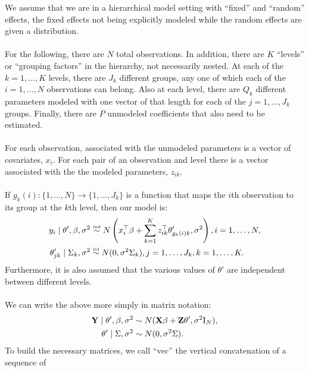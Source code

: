 \documentclass[10pt]{article}
\begin{document}
\normalem
\newcommand{\tr}[1]{\ensuremath{#1^{\text{\tiny T}}}}
\newcommand{\itr}[1]{\ensuremath{#1^{\text{\tiny -T}}}}
\setlength{\parindent}{0pt}

We assume that we are in a hierarchical model setting with ``fixed''
and ``random'' effects, the fixed effects not being explicitly modeled
while the random effects are given a distribution. \\ \\
For the following, there are $N$ total observations. In addition,
there are $K$ ``levels'' or ``grouping factors'' in the hierarchy, not necessarily
nested. At each of the $k=1,\ldots,K$ levels, there are $J_k$
different groups, any one of which each of the $i=1,\ldots,N$
observations can belong. Also at each level, there are $Q_k$
different parameters modeled with one vector of that length for
each of the $j=1,\ldots,J_k$ groups. Finally, there are $P$
unmodeled coefficients that also need to be estimated. \\ \\
For each observation, associated with the unmodeled parameters is a
vector of covariates, $x_i$. For each pair of an observation and
level there is a vector associated with the the modeled parameters, $z_{ik}$. \\ \\
If \(g_k(i) : \{1,\ldots,N\} \rightarrow \{1,\ldots,J_k\}\) is a
function that maps the $i$th observation to its group at the $k$th
level, then our model is:
\begin{align*}
y_i \mid \theta', \beta, \sigma^2 & \overset{\text{\tiny ind}}{\sim}
N\left(x_i^\top\beta + \sum_{k=1}^K z_{ik}^\top\theta_{g_k(i)k}', \sigma^2\right), i=1,\ldots,N, \\
\theta_{jk}' \mid \Sigma_k, \sigma^2 & \overset{\text{\tiny iid}}{\sim}
N(0, \sigma^2\Sigma_k), j=1,\ldots,J_k, k=1,\ldots,K.
\end{align*}
Furthermore, it is also assumed that the various values of $\theta'$
are independent between different levels. \\ \\
We can write the above more simply in matrix notation:
\begin{align*}
{\bf Y} \mid \theta', \beta, \sigma^2 & \sim
N({\bf X}\beta + {\bf Z}\theta', \sigma^2 \mathrm{I}_N), \\
\theta' \mid \Sigma, \sigma^2 & \sim N(0, \sigma^2 \Sigma).
\end{align*} 
To build the necessary matrices, we call ``\(\mathrm{vec}\)'' the vertical concatenation of a sequence of
\end{document}
